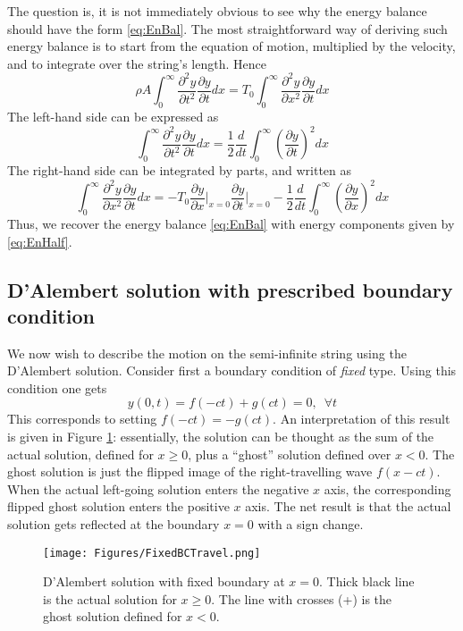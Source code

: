 \documentclass[11pt,twoside,a4paper,english]{book}
\begin{document}
\noindent
The question is, it is not immediately obvious to see why the energy balance should have the form \eqref{eq:EnBal}. The most straightforward way of deriving such energy balance is to start from the equation of motion, multiplied by the velocity, and to integrate over the string's length. Hence
\begin{equation}
\rho A \int_0^{\infty} \frac{\partial^2 y}{\partial t^2} \frac{\partial y}{\partial t} dx = T_0 \int_0^{\infty} \frac{\partial^2 y}{\partial x^2} \frac{\partial y}{\partial t} dx
\end{equation}
The left-hand side can be expressed as
\begin{equation}
\int_0^{\infty}\frac{\partial^2 y}{\partial t^2} \frac{\partial y}{\partial t} dx = \frac{1}{2}\frac{d}{dt}\int_0^{\infty} \left( \frac{\partial y}{\partial t}\right)^2 dx
\end{equation}
The right-hand side can be integrated by parts, and written as
\begin{equation}
\int_0^{\infty} \frac{\partial^2 y}{\partial x^2} \frac{\partial y}{\partial t} dx = - T_0 \frac{\partial y}{\partial x }\Bigg|_{x=0}\frac{\partial y}{\partial t }\Bigg|_{x=0} - \frac{1}{2}\frac{d}{dt}  \int_0^{\infty}\left( \frac{\partial y}{\partial x}\right)^2 dx
\end{equation}
Thus, we recover the energy balance \eqref{eq:EnBal} with energy components given by \eqref{eq:EnHalf}. 





\subsection{D'Alembert solution with prescribed boundary condition}


We now wish to describe the motion on the semi-infinite string using the D'Alembert solution. Consider first a boundary condition of \emph{fixed} type. Using this condition one gets
\begin{equation}
y(0,t) = f(-ct) + g(ct) = 0, \,\,\, \forall t
\end{equation}
This corresponds to setting $f(-ct) = -g(ct)$. An interpretation of this result is given in Figure \ref{fig:DalFixed}: essentially, the solution can be thought as the sum of the actual solution, defined for $x\geq 0$, plus a ``ghost'' solution defined over $x<0$. The ghost solution is just the flipped image of the right-travelling wave $f(x-ct)$. When the actual left-going solution enters the negative $x$ axis, the corresponding flipped ghost solution enters the positive $x$ axis. The net result is that the actual solution gets reflected at the boundary $x=0$ with a sign change. 
\begin{figure}[hbt]
\texttt{[image: Figures/FixedBCTravel.png]}
\caption{D'Alembert solution with fixed boundary at $x=0$. Thick black line is the actual solution for $x\geq 0$. The line with crosses (+) is the ghost solution defined for $x<0$.}\label{fig:DalFixed}
\end{figure}
\end{document}
